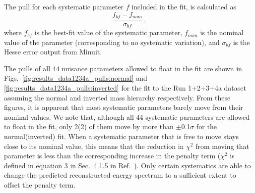 The pull for each systematic parameter $f$ included in the fit, is calculated as
\begin{equation}
\frac{f_{bf} - f_{nom}}{\sigma_{bf}},
\end{equation}
where 
$f_{bf}$ is the best-fit value of the systematic parameter,
$f_{nom}$ is the nominal value of the parameter (corresponding to no systematic variation), and
$\sigma_{bf}$ is the Hesse error output from Minuit.

The pulls of all 44 nuisance parameters allowed to float in the fit are shown in 
Figs.\ \ref{fig:results_data1234a_pulls:normal} and \ref{fig:results_data1234a_pulls:inverted}
for the fit to the Run 1+2+3+4a dataset assuming the normal and inverted mass hierarchy respectively.
From these figures, it is apparent that most systematic parameters barely move from their nominal values.
We note that, although all 44 systematic parameters are allowed to float in the fit,
only 2(2) of them move by more than $\pm$0.1$\sigma$ for the normal(inverted) fit. 
When a systematic parameter that is free to move stays close to its nominal value, this means that 
the reduction in $\chi^{2}$ from moving that parameter is less than the corresponding increase 
in the penalty term ($\chi^{2}$ is defined in equation 3 in Sec.\ 4.1.5 in Ref.\ \cite{OurRun123DisappAnalysis3Flavour}). 
Only certain systematics are able to change the predicted reconstructed energy spectrum to a 
sufficient extent to offset the penalty term. 

